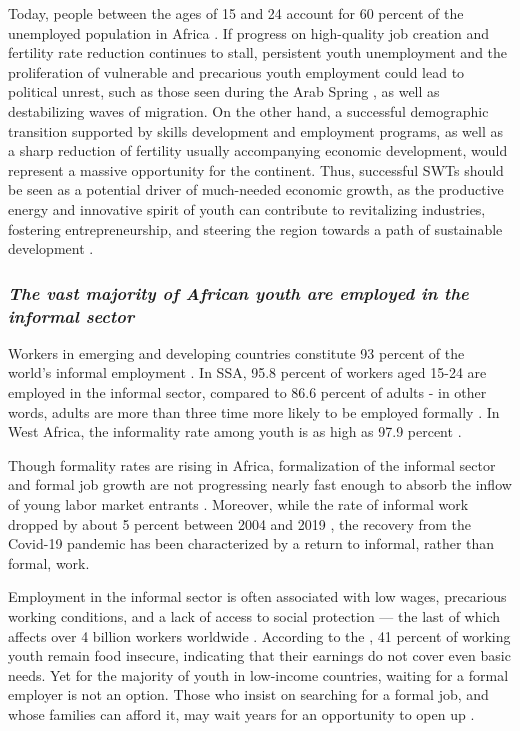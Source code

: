 \documentclass[
  a4paper, twoside, 12pt]{book}
\begin{document}
Today, people between the ages of 15 and 24 account for 60 percent of the unemployed population in Africa \autocite{bonnet2018}. If progress on high-quality job creation and fertility rate reduction continues to stall, persistent youth unemployment and the proliferation of vulnerable and precarious youth employment could lead to political unrest, such as those seen during the Arab Spring \autocite{urdal2006}, as well as destabilizing waves of migration. On the other hand, a successful demographic transition supported by skills development and employment programs, as well as a sharp reduction of fertility usually accompanying economic development, would represent a massive opportunity for the continent. Thus, successful SWTs should be seen as a potential driver of much-needed economic growth, as the productive energy and innovative spirit of youth can contribute to revitalizing industries, fostering entrepreneurship, and steering the region towards a path of sustainable development \autocite{filmer2014,worldbank2019}.

\hypertarget{the-vast-majority-of-african-youth-are-employed-in-the-informal-sector}{%
\subsubsection*{\texorpdfstring{\emph{The vast majority of African youth are employed in the informal sector}}{The vast majority of African youth are employed in the informal sector}}\label{the-vast-majority-of-african-youth-are-employed-in-the-informal-sector}}

Workers in emerging and developing countries constitute 93 percent of the world's informal employment \autocite{bonnet2018}. In SSA, 95.8 percent of workers aged 15-24 are employed in the informal sector, compared to 86.6 percent of adults - in other words, adults are more than three time more likely to be employed formally \autocite{kiaga2020}. In West Africa, the informality rate among youth is as high as 97.9 percent \autocite{bonnet2018}.

Though formality rates are rising in Africa, formalization of the informal sector and formal job growth are not progressing nearly fast enough to absorb the inflow of young labor market entrants \autocite{filmer2014}. Moreover, while the rate of informal work dropped by about 5 percent between 2004 and 2019 \autocite{ilo2023}, the recovery from the Covid-19 pandemic has been characterized by a return to informal, rather than formal, work.

Employment in the informal sector is often associated with low wages, precarious working conditions, and a lack of access to social protection --- the last of which affects over 4 billion workers worldwide \autocite{ilo2023a}. According to the \textcite{africandevelopmentbank2016a}, 41 percent of working youth remain food insecure, indicating that their earnings do not cover even basic needs. Yet for the majority of youth in low-income countries, waiting for a formal employer is not an option. Those who insist on searching for a formal job, and whose families can afford it, may wait years for an opportunity to open up \autocite{serneels2007,manacorda2017}.
\end{document}
